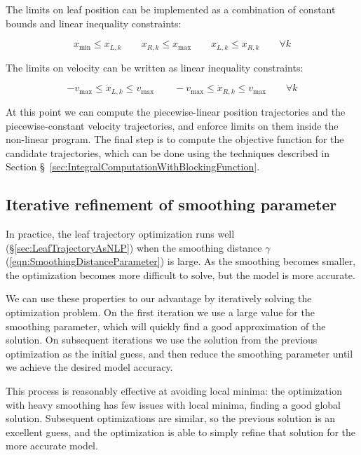 \documentclass[12pt]{article}
\begin{document}
The limits on leaf position can be implemented as a combination of
constant bounds and linear inequality constraints:

\begin{equation}
  x_\text{min} \leq x_{L, k}
  \quad \quad
  x_{R, k} \leq x_\text{max}
  \quad \quad
  x_{L, k} \leq x_{R, k}
  \quad \quad
  \forall k
  \label{eqn:PositionLimits}
\end{equation}

The limits on velocity can be written as linear inequality constraints:

\begin{equation}
  -v_\text{max} \leq \dot{x}_{L, k} \leq v_\text{max}
  \quad \quad
  -v_\text{max} \leq \dot{x}_{R, k} \leq v_\text{max}
  \quad \quad \forall k
  \label{eqn:VelocityLimits}
\end{equation}

At this point we can compute the piecewise-linear position trajectories and the
piecewise-constant velocity trajectories, and enforce limits on them inside the non-linear program.
The final step is to compute the objective function for the candidate trajectories,
which can be done using the techniques described in Section \S~\ref{sec:IntegralComputationWithBlockingFunction}.

\subsection{Iterative refinement of smoothing parameter}

In practice, the leaf trajectory optimization runs well (\S\ref{sec:LeafTrajectoryAsNLP})
when the smoothing distance $\gamma$ (\ref{eqn:SmoothingDistanceParameter}) is large.
As the smoothing becomes smaller, the optimization becomes more difficult to solve,
but the model is more accurate.

We can use these properties to our advantage by iteratively solving the optimization problem.
On the first iteration we use a large value for the smoothing parameter,
which will quickly find a good approximation of the solution.
On subsequent iterations we use the solution from the previous optimization as the initial guess,
and then reduce the smoothing parameter until we achieve the desired model accuracy.

This process is reasonably effective at avoiding local minima:
the optimization with heavy smoothing has few issues with local minima, finding a good global solution.
Subsequent optimizations are similar, so the previous solution is an excellent guess,
and the optimization is able to simply refine that solution for the more accurate model.
\end{document}
